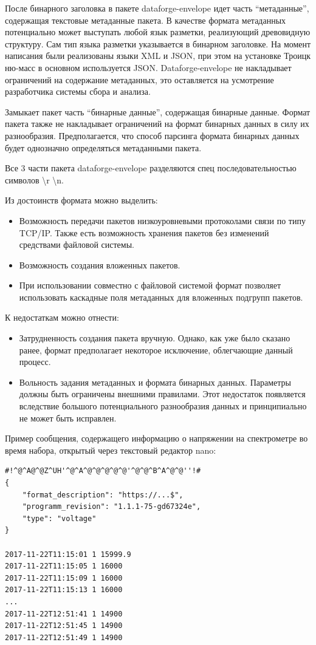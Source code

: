 \documentclass[a4paper,14pt]{extreport}
\begin{document}
После бинарного заголовка в пакете dataforge-envelope идет часть “метаданные”, содержащая текстовые метаданные пакета. В качестве формата метаданных потенциально может выступать любой язык разметки, реализующий древовидную структуру. Сам тип языка разметки указывается в бинарном заголовке. На момент написания были реализованы языки XML и JSON, при этом на установке Троицк ню-масс в основном используется JSON. Dataforge-envelope не накладывает ограничений на содержание метаданных, это оставляется на усмотрение разработчика системы сбора и анализа.

Замыкает пакет часть “бинарные данные”, содержащая бинарные данные. Формат пакета также не накладывает ограничений на формат бинарных данных в силу их разнообразия. Предполагается, что способ парсинга формата бинарных данных будет однозначно определяться метаданными пакета.

Все 3 части пакета dataforge-envelope разделяются спец последовательностью символов \colorbox{Gainsboro!60!Lavender}{\textbackslash r \textbackslash n}.

Из достоинств формата можно выделить:
\begin{itemize}
    \item Возможность передачи пакетов низкоуровневыми протоколами связи по типу TCP/IP. Также есть возможность хранения пакетов без изменений средствами файловой системы.
    \item Возможность создания вложенных пакетов.
    \item При использовании совместно с файловой системой формат позволяет использовать каскадные поля метаданных для вложенных подгрупп пакетов.
\end{itemize}
К недостаткам можно отнести:
\begin{itemize}
    \item Затрудненность создания пакета вручную. Однако, как уже было сказано ранее, формат предполагает некоторое исключение, облегчающие данный процесс.
    \item Вольность задания метаданных и формата бинарных данных. Параметры должны быть ограничены внешними правилами. Этот недостаток появляется вследствие большого потенциального разнообразия данных и принципиально не может быть исправлен.
\end{itemize}
Пример сообщения, содержащего информацию о напряжении на спектрометре во время набора, открытый через текстовый редактор nano:
\begin{lstlisting}[caption={Пример сообщения в формате Dataforge Envelope.}, captionpos=b]
#!^@^A@^@Z^UH'^@^A^@^@^@^@^@'^@^@^B^A^@^@''!#
{
    "format_description": "https://...$",
    "programm_revision": "1.1.1-75-gd67324e",
    "type": "voltage"
}

2017-11-22T11:15:01 1 15999.9
2017-11-22T11:15:05 1 16000
2017-11-22T11:15:09 1 16000
2017-11-22T11:15:13 1 16000
...
2017-11-22T12:51:41 1 14900
2017-11-22T12:51:45 1 14900
2017-11-22T12:51:49 1 14900
\end{lstlisting}
\end{document}
